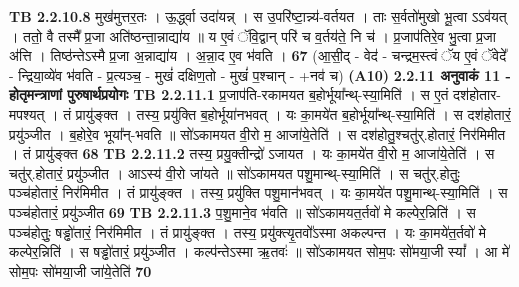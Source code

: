 \documentclass[17pt]{extarticle}
\begin{document}
                                \textbf{ TB 2.2.10.8} \newline
                  मुख॑मुत्तर॒तः । ऊ॒र्द्ध्वा उदा॑यन्न् । स उ॒परि॑ष्टा॒न्न्य॑-वर्तयत । ताः स॒र्वतो॑मुखो भू॒त्वा ऽऽव॑यत् । ततो॒ वै तस्मै᳚ प्र॒जा अति॑ष्ठन्ता॒न्नाद्या॑य ॥ य ए॒वं ॅवि॒द्वान् परि॑ च व॒र्तय॑ते॒ नि च॑ । प्र॒जाप॑तिरे॒व भु॒त्वा प्र॒जा अ॑त्ति । तिष्ठ॑न्तेऽस्मै प्र॒जा अ॒न्नाद्या॑य । अ॒न्ना॒द ए॒व भ॑वति । \textbf{ 67} \newline
                  \newline
                                    (आ॒सी॒द् - वेद॑ - चन्द्रम॒स्त्वं ॅय ए॒वं ॅवेदे᳚ - न्द्रिया॒व्ये॑व भ॑वति - प्र॒त्यञ्च॒ - मुखं॑ दक्षिण॒तो - मुखं॑ प॒श्चान् - +नव॑ च) \textbf{(A10)} \newline \newline
                \textbf{ 2.2.11    अनुवाकं   11 - होतृमन्त्राणां पुरुषार्थप्रयोगः} \newline
                                \textbf{ TB 2.2.11.1} \newline
                  प्र॒जाप॑ति-रकामयत ब॒होर्भूया᳚न्थ्-स्या॒मिति॑ । स ए॒तं दश॑होतार-मपश्यत् । तं प्रायु॑ङ्क्त । तस्य॒ प्रयु॑क्ति ब॒होर्भूया॑नभवत् । यः का॒मये॑त ब॒होर्भूया᳚न्थ्-स्या॒मिति॑ । स दश॑होतारं॒ प्रयु॑ञ्जीत । ब॒होरे॒व भूया᳚न्-भवति ॥ सो॑ऽकामयत वी॒रो म॒ आजा॑ये॒तेति॑ । स दश॑होतु॒श्चतु॑र्.होतारं॒ निर॑मिमीत । तं प्रायु॑ङ्क्त \textbf{ 68} \newline
                  \newline
                                \textbf{ TB 2.2.11.2} \newline
                  तस्य॒ प्रयु॒क्तीन्द्रो॑ ऽजायत । यः का॒मये॑त वी॒रो म॒ आजा॑ये॒तेति॑ । स चतु॑र्.होतारं॒ प्रयु॑ञ्जीत । आऽस्य॑ वी॒रो जा॑यते ॥ सो॑ऽकामयत पशु॒मान्थ्-स्या॒मिति॑ । स चतु॑र्.होतुः॒ पञ्च॑होतारं॒ निर॑मिमीत । तं प्रायु॑ङ्क्त । तस्य॒ प्रयु॑क्ति पशु॒मान॑भवत् । यः का॒मये॑त पशु॒मान्थ्-स्या॒मिति॑ । स पञ्च॑होतारं॒ प्रयु॑ञ्जीत \textbf{ 69} \newline
                  \newline
                                \textbf{ TB 2.2.11.3} \newline
                  प॒शु॒माने॒व भ॑वति ॥ सो॑ऽकामयत॒र्तवो॑ मे कल्पेर॒न्निति॑ । स पञ्च॑होतुः॒ षड्ढो॑तारं॒ निर॑मिमीत । तं प्रायु॑ङ्क्त । तस्य॒ प्रयु॑क्त्यृ॒तवो᳚ऽस्मा अकल्पन्त । यः का॒मये॑त॒र्तवो॑ मे कल्पेर॒न्निति॑ । स षड्ढो॑तारं॒ प्रयु॑ञ्जीत । कल्प॑न्तेऽस्मा ऋ॒तवः॑ ॥ सो॑ऽकामयत सोम॒पः सो॑मया॒जी स्यां᳚ । आ मे॑ सोम॒पः सो॑मया॒जी जा॑ये॒तेति॑ \textbf{ 70} \newline
                  \newline
\end{document}
